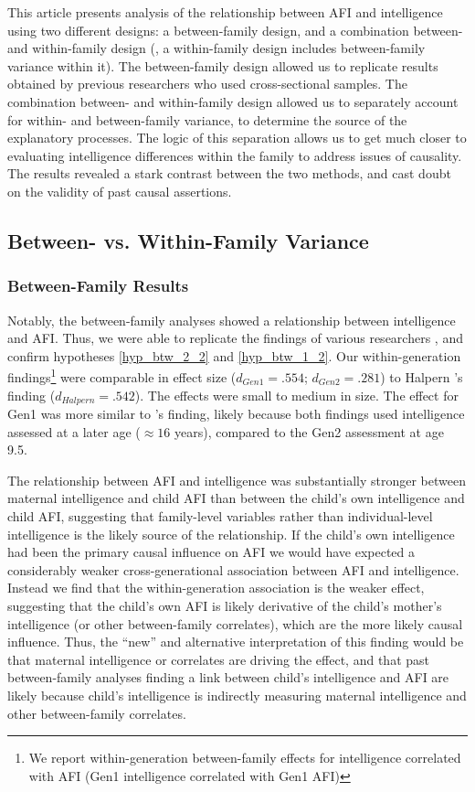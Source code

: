 This article presents analysis of the relationship between AFI and intelligence using two different designs: a between-family design, and a combination between- and within-family design (\ie, a within-family design includes between-family variance within it). The between-family design allowed us to replicate results obtained by previous researchers who used cross-sectional samples. The combination between- and within-family design allowed us to separately account for within- and between-family variance, to determine the source of the explanatory processes.  The logic of this separation allows us to get much closer to evaluating intelligence differences within the family to address issues of causality. The results revealed a stark contrast between the two methods, and cast doubt on the validity of past causal assertions.
\subsection{Between- vs. Within-Family Variance}
\subsubsection{Between-Family Results} Notably, the between-family analyses showed a relationship between intelligence and AFI. Thus, we were able to replicate the findings of various researchers \citep{halpern2000smart,mott1983early,Paul2000,Woodward2001}, and confirm hypotheses \ref{hyp_btw_2_2} and \ref{hyp_btw_1_2}. Our within-generation findings\footnote{We report within-generation between-family effects for intelligence correlated with AFI (\eg Gen1 intelligence correlated with Gen1 AFI)} were comparable in effect size ($d_{Gen1} =.554$; $d_{Gen2} = .281$) to Halpern \et's \citeyear{halpern2000smart} finding ($d_{Halpern} = .542$). The effects were small to medium in size. The effect for Gen1 was more similar to \citet{halpern2000smart}'s finding, likely because both findings used intelligence assessed at a later age ($\approx 16$ years), compared to the Gen2 assessment at age 9.5.

The relationship between AFI and intelligence was substantially stronger between maternal intelligence and child AFI than between the child's own intelligence and child AFI, suggesting that family-level variables rather than individual-level intelligence is the likely source of the relationship. If the child's own intelligence had been the primary causal influence on AFI we would have expected a considerably weaker cross-generational association between AFI and intelligence. Instead we find that the within-generation association is the weaker effect, suggesting that the child's own AFI is likely derivative of the child's mother's intelligence (or other between-family correlates), which are the more likely causal influence. Thus, the ``new'' and alternative interpretation of this finding would be that maternal intelligence or correlates are driving the effect, and that past between-family analyses finding a link between child's intelligence and AFI are likely because child's intelligence is indirectly measuring maternal intelligence and other between-family correlates. 

